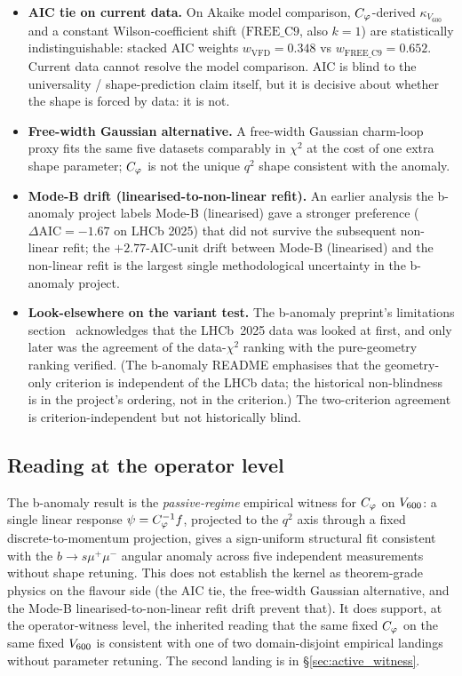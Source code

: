 \begin{itemize}\itemsep=2pt
\item \textbf{AIC tie on current data.} On Akaike model comparison,
  $C_{\varphi}$-derived $\kappa_{V_{600}}$ and a constant Wilson-coefficient
  shift ($\mathrm{FREE\_C9}$, also $k=1$) are statistically
  indistinguishable: stacked AIC weights
  $w_{\mathrm{VFD}} = 0.348$ vs $w_{\mathrm{FREE\_C9}} = 0.652$.
  Current data cannot resolve the model comparison. AIC is blind
  to the universality / shape-prediction claim itself, but it is
  decisive about whether the shape is forced by data: it is not.
\item \textbf{Free-width Gaussian alternative.} A free-width
  Gaussian charm-loop proxy fits the same five datasets comparably
  in $\chi^{2}$ at the cost of one extra shape parameter; $C_{\varphi}$
  is not the unique $q^{2}$ shape consistent with the anomaly.
\item \textbf{Mode-B drift (linearised-to-non-linear refit).} An
  earlier analysis the b-anomaly project labels Mode-B
  (linearised) gave a stronger preference
  ($\Delta\mathrm{AIC} = -1.67$ on LHCb 2025) that did not survive
  the subsequent non-linear refit; the $+2.77$-AIC-unit drift
  between Mode-B (linearised) and the non-linear refit is the
  largest single methodological uncertainty in the b-anomaly
  project.
\item \textbf{Look-elsewhere on the variant test.} The b-anomaly
  preprint's limitations section~\citep{SmartBAnomaly2026}
  acknowledges that the LHCb~2025 data was looked at first, and
  only later was the agreement of the data-$\chi^{2}$ ranking with
  the pure-geometry ranking verified. (The b-anomaly README
  emphasises that the geometry-only criterion is independent of
  the LHCb data; the historical non-blindness is in the project's
  ordering, not in the criterion.) The two-criterion agreement is
  criterion-independent but not historically blind.
\end{itemize}

\subsection{Reading at the operator level}

The b-anomaly result is the \emph{passive-regime} empirical
witness for $C_{\varphi}$ on $V_{600}$: a single linear response
$\psi = C_{\varphi}^{-1} f$, projected to the $q^{2}$ axis through a
fixed discrete-to-momentum projection, gives a sign-uniform
structural fit consistent with the $b\to s\mu^{+}\mu^{-}$ angular
anomaly across five independent measurements without shape
retuning. This does
not establish the kernel as theorem-grade physics on the flavour
side (the AIC tie, the free-width Gaussian alternative, and the
Mode-B linearised-to-non-linear refit drift prevent that). It
does support, at the operator-witness level, the inherited reading
that the same fixed $C_{\varphi}$ on the same fixed $V_{600}$ is
consistent with one of two domain-disjoint empirical landings without
parameter retuning. The
second landing is in \S\ref{sec:active_witness}.
